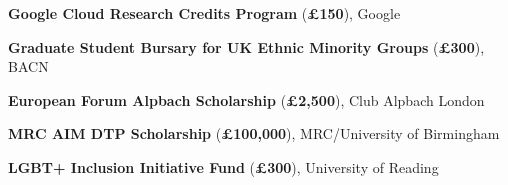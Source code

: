 	{\textbf{Google Cloud Research Credits Program} (\textbf{£150}), Google}

	{\textbf{Graduate Student Bursary for UK Ethnic Minority Groups} (\textbf{£300}), BACN
	}

\cvitem[35.5bp]{}
	{\textbf{European Forum Alpbach Scholarship} (\textbf{£2,500}), Club Alpbach London
	}

	{\textbf{MRC AIM DTP Scholarship} (\textbf{£100,000}), MRC/University of Birmingham
	}

\cvitem[35.5bp]{}
	{\textbf{LGBT+ Inclusion Initiative Fund} (\textbf{£300}), University of Reading}
